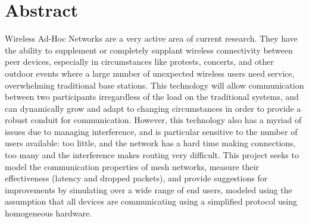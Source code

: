 \section{Abstract}
Wireless Ad-Hoc Networks are a very active area of current research.
They have the ability to supplement or completely supplant wireless connectivity between peer devices,
especially in circumstances like protests, concerts, and other outdoor events where a large number of
unexpected wireless users need service, overwhelming traditional base stations.
This technology will allow communication between two participants irregardless of the load on the
traditional systems, and can dynamically grow and adapt to changing circumstances in order to provide
a robust conduit for communication.
However, this technology also has a myriad of issues due to managing interference, and is particular
sensitive to the number of users available: too little, and the network has a hard time making
connections, too many and the interference makes routing very difficult.
This project seeks to model the communication properties of mesh networks, 
measure their effectiveness (latency and dropped packets), 
and provide suggestions for improvements by simulating over a wide range of end users, 
modeled using the assumption that all devices are communicating using a simplified protocol
using homogeneous hardware.
